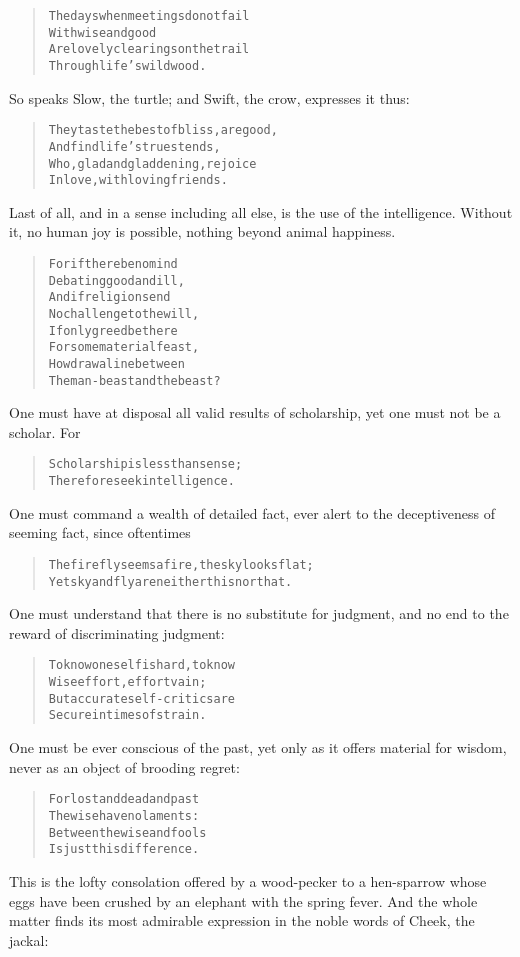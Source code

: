 \documentclass[article, twoside, 14pt]{memoir}
\renewenvironment{verbatim}{%
\begin{quote}%
\vskip -10pt%
\begin{alltt}\normalfont\large}{\end{alltt}%
\end{quote}%
\vskip -10pt
} %
\begin{document}
\begin{verbatim}
The days when meetings do not fail
    With wise and good
Are lovely clearings on the trail
    Through life's wild wood.
\end{verbatim}
So speaks Slow, the turtle; and Swift, the crow, expresses it
thus:

\begin{verbatim}
They taste the best of bliss, are good,
    And find life's truest ends,
Who, glad and gladdening, rejoice
    In love, with loving friends.
\end{verbatim}
Last of all, and in a sense including all else, is the use of the
intelligence. Without it, no human joy is possible, nothing beyond
animal happiness.

\begin{verbatim}
For if there be no mind
    Debating good and ill,
And if religion send
    No challenge to the will,
If only greed be there
    For some material feast,
How draw a line between
    The man-beast and the beast?
\end{verbatim}
One must have at disposal all valid results of scholarship, yet one
must not be a scholar. For

\begin{verbatim}
Scholarship is less than sense;
Therefore seek intelligence.
\end{verbatim}
One must command a wealth of detailed fact, ever alert to the
deceptiveness of seeming fact, since oftentimes

\begin{verbatim}
The firefly seems a fire, the sky looks flat;
Yet sky and fly are neither this nor that.
\end{verbatim}
One must understand that there is no substitute for judgment, and
no end to the reward of discriminating judgment:

\begin{verbatim}
To know oneself is hard, to know
    Wise effort, effort vain;
But accurate self-critics are
    Secure in times of strain.
\end{verbatim}
One must be ever conscious of the past, yet only as it offers
material for wisdom, never as an object of brooding regret:

\begin{verbatim}
For lost and dead and past
    The wise have no laments:
Between the wise and fools
    Is just this difference.
\end{verbatim}
This is the lofty consolation offered by a wood-pecker to a
hen-sparrow whose eggs have been crushed by an elephant with the
spring fever. And the whole matter finds its most admirable
expression in the noble words of Cheek, the jackal:
\end{document}

